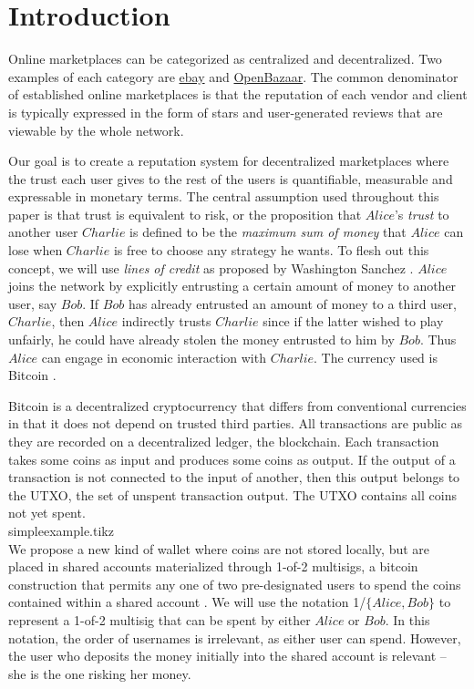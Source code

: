 \section{Introduction}
  Online marketplaces can be categorized as centralized and decentralized.
  Two examples of each category are \href{http://www.ebay.com}{ebay} and \href{https://openbazaar.org/}{OpenBazaar}.
  The common denominator of established online marketplaces is that the reputation of each vendor and client is typically
  expressed in the form of stars and user-generated reviews that are viewable by the whole network.

  Our goal is to create a reputation system for decentralized marketplaces where the trust each user gives to the rest of
  the users is quantifiable, measurable and expressable in monetary terms. The central assumption used throughout this paper
  is that trust is equivalent to risk, or the proposition that $Alice$'s \textit{trust} to another user $Charlie$ is defined
  to be the \textit{maximum sum of money} that $Alice$ can lose when $Charlie$ is free to choose any strategy he wants. To
  flesh out this concept, we will use \textit{lines of credit} as proposed by Washington Sanchez \cite{loc}. $Alice$ joins the
  network by explicitly entrusting a certain amount of money to another user, say $Bob$. If $Bob$ has already entrusted an
  amount of money to a third user, $Charlie$, then $Alice$ indirectly trusts $Charlie$ since if the latter wished to play
  unfairly, he could have already stolen the money entrusted to him by $Bob$. Thus $Alice$ can engage in economic interaction
  with $Charlie$. The currency used is Bitcoin \cite{bitcoin}.

  Bitcoin is a decentralized cryptocurrency that differs from conventional currencies in that it does not depend on trusted
  third parties. All transactions are public as they are recorded on a decentralized ledger, the blockchain. Each transaction
  takes some coins as input and produces some coins as output. If the output of a transaction is not connected to the input
  of another, then this output belongs to the UTXO, the set of unspent transaction output. The UTXO contains all coins not
  yet spent.
  \medskip \ \\
  {simpleexample.tikz} \smallskip \ \\
  We propose a new kind of wallet where coins are not stored locally, but are placed in shared accounts materialized through
  1-of-2 multisigs, a bitcoin construction that permits any one of two pre-designated users to spend the coins contained
  within a shared account \cite{masteringbitcoin}. We will use the notation 1/$\{Alice, Bob\}$ to represent a 1-of-2
  multisig that can be spent by either $Alice$ or $Bob$. In this notation, the order of usernames is irrelevant, as either
  user can spend. However, the user who deposits the money initially into the shared account is relevant -- she is the one
  risking her money.

